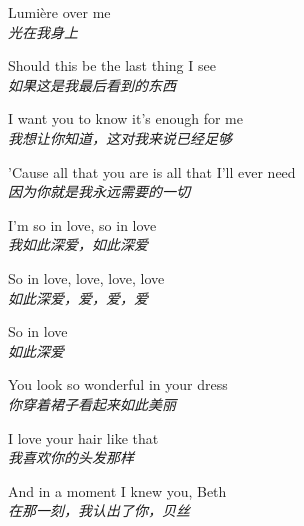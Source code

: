 \begin{spacing}{1.5}
\begin{flushleft}
Lumière over me\\
\textit{光在我身上}\lyricspace

Should this be the last thing I see\\
\textit{如果这是我最后看到的东西}\lyricspace

I want you to know it's enough for me\\
\textit{我想让你知道，这对我来说已经足够}\lyricspace

'Cause all that you are is all that I'll ever need\\
\textit{因为你就是我永远需要的一切}\lyricspace

I'm so in love, so in love\\
\textit{我如此深爱，如此深爱}\lyricspace

So in love, love, love, love\\
\textit{如此深爱，爱，爱，爱}\lyricspace

So in love\\
\textit{如此深爱}\lyricspace

You look so wonderful in your dress\\
\textit{你穿着裙子看起来如此美丽}\lyricspace

I love your hair like that\\
\textit{我喜欢你的头发那样}\lyricspace

And in a moment I knew you, Beth\\
\textit{在那一刻，我认出了你，贝丝}\lyricspace
\end{flushleft}
\end{spacing} 
